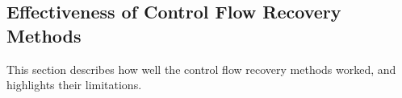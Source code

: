 
\subsection{Effectiveness of Control Flow Recovery Methods}

This section describes how well the control flow recovery methods worked, and highlights their limitations.

 \\
